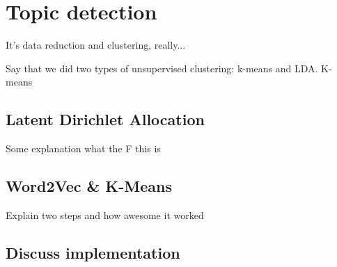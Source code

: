 





\section{Topic detection}
\label{sec:topic_detection}
It's data reduction and clustering, really...

Say that we did two types of unsupervised clustering: k-means and LDA. K-means

\subsection{Latent Dirichlet Allocation}
Some explanation what the F this is

\lipsum[1]

\subsection{Word2Vec \& K-Means}
Explain two steps and how awesome it worked

\lipsum[1]

\subsection{Discuss implementation}




